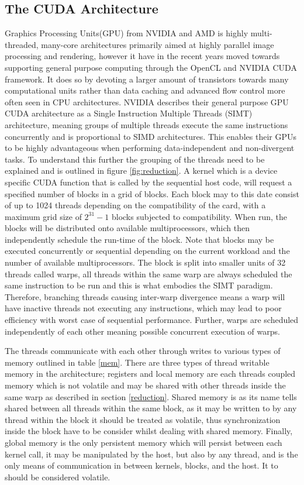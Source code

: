 \documentclass{llncs}
\begin{document}
\subsection{The CUDA Architecture} %
Graphics Processing Units(GPU) from NVIDIA and AMD is highly multi-threaded, many-core architectures primarily aimed at 
highly parallel image processing and rendering, however it have in the recent years moved towards supporting general purpose computing through 
the OpenCL and NVIDIA CUDA framework.
It does so by devoting a larger amount of transistors towards many computational units rather than data caching and advanced 
flow control more often seen in CPU architectures.
NVIDIA describes their general purpose GPU CUDA architecture as a Single Instruction Multiple Threads (SIMT) architecture, 
meaning groups of multiple threads execute the same instructions concurrently and is proportional to SIMD architectures. 
This enables their GPUs to be highly advantageous when performing data-independent and non-divergent tasks.
To understand this further the grouping of the threads need to be explained and is outlined in figure \ref{fig:reduction}.
A kernel which is a device specific CUDA function that is called by the sequential host code,
will request a specified number of blocks in a grid of blocks.
Each block may to this date consist of up to 1024 threads depending on the compatibility of the card, with a maximum
grid size of $2^{31}-1$ blocks subjected to compatibility. When run, the blocks will be distributed onto available multiprocessors,
which then independently schedule the run-time of the block. Note that blocks may be executed concurrently or sequential depending on
the current workload and the number of available multiprocessors.
The block is split into smaller units of 32 threads called warps, all threads within the same warp are always scheduled
the same instruction to be run and this is what embodies the SIMT paradigm. 
Therefore, branching threads causing inter-warp divergence means a warp will have inactive threads not executing any instructions, 
which may lead to poor efficiency with worst case of sequential performance. Further, warps are scheduled independently of each other
meaning possible concurrent execution of warps.

The threads communicate with each other through writes to various types of memory outlined in table \ref{mem}.
There are three types of thread writable memory in the architecture; registers and local memory are each threads
coupled memory which is not volatile and may be shared with other threads inside the same warp as described in section \ref{reduction}. 
Shared memory is as its name tells shared between all threads within the same block, as it may be written to by any thread within the block
it should be treated as volatile, thus synchronization inside the block have to be consider whilst dealing with shared memory.
Finally, global memory is the only persistent memory which will persist between each kernel call, it may be manipulated by the host,
but also by any thread, and is the only means of communication in between kernels, blocks, and the host. It to should be considered volatile.
\end{document}
